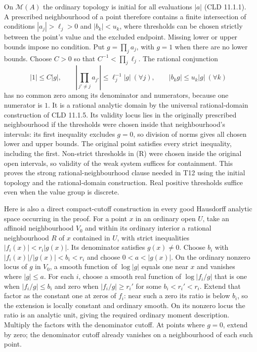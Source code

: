\documentclass[
  10pt,
]{article}
\begin{document}
On \(\mathcal M(A)\) the ordinary topology is initial for all
evaluations \(|a|\) (CLD 11.1.1). A prescribed neighbourhood of a point
therefore contains a finite intersection of conditions
\(|a_j|>\ell_j>0\) and \(|b_k|<u_k\), where thresholds can be chosen
strictly between the point's value and the excluded endpoint. Missing
lower or upper bounds impose no condition. Put \(g=\prod_j a_j\), with
\(g=1\) when there are no lower bounds. Choose \(C>0\) so that
\(C^{-1}<\prod_j\ell_j\). The rational conjunction \[
 |1|\le C|g|,\qquad
 |\prod_{j'\ne j}a_{j'}|\le\ell_j^{-1}|g|\ (\forall j),\qquad
 |b_kg|\le u_k|g|\ (\forall k)                         \tag{R}
\] has no common zero among its denominator and numerators, because one
numerator is \(1\). It is a rational analytic domain by the universal
rational-domain construction of CLD 11.1.5. Its validity locus lies in
the originally prescribed neighbourhood if the thresholds were chosen
inside that neighbourhood's intervals: its first inequality excludes
\(g=0\), so division of norms gives all chosen lower and upper bounds.
The original point satisfies every strict inequality, including the
first. Non-strict thresholds in (R) were chosen inside the original open
intervals, so validity of the weak system suffices for containment. This
proves the strong rational-neighbourhood clause needed in T12 using the
initial topology and the rational-domain construction. Real positive
thresholds suffice even when the value group is discrete.

Here is also a direct compact-cutoff construction in every good
Hausdorff analytic space occurring in the proof. For a point \(x\) in an
ordinary open \(U\), take an affinoid neighbourhood \(V_0\) and within
its ordinary interior a rational neighbourhood \(R\) of \(x\) contained
in \(U\), with strict inequalities \(|f_i(x)|<r_i|g(x)|\). Its
denominator satisfies \(g(x)\ne0\). Choose \(b_i\) with
\(|f_i(x)|/|g(x)|<b_i<r_i\) and choose \(0<a<|g(x)|\). On the ordinary
nonzero locus of \(g\) in \(V_0\), a smooth function of \(\log|g|\)
equals one near \(x\) and vanishes where \(|g|\le a\). For each \(i\),
choose a smooth real function of \(\log|f_i/g|\) that is one when
\(|f_i/g|\le b_i\) and zero when \(|f_i/g|\ge r_i'\) for some
\(b_i<r_i'<r_i\). Extend that factor as the constant one at zeros of
\(f_i\): near such a zero its ratio is below \(b_i\), so the extension
is locally constant and ordinary smooth. On its nonzero locus the ratio
is an analytic unit, giving the required ordinary moment description.
Multiply the factors with the denominator cutoff. At points where
\(g=0\), extend by zero; the denominator cutoff already vanishes on a
neighbourhood of each such point.
\end{document}
